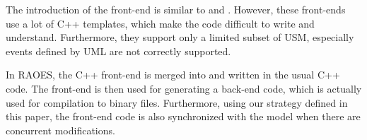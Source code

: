 The introduction of the front-end is similar to  \cite{MSM} and  \cite{EUML}.
However, these front-ends use a lot of C++ templates, which make the code difficult to write and understand.
Furthermore, they support only a limited subset of USM, especially events defined by UML are not correctly supported.

In RAOES, the C++ front-end is merged into and written in the usual C++ code.
The front-end is then used for generating a back-end code, which is actually used for compilation to binary files.
Furthermore, using our strategy defined in this paper, the front-end code is also synchronized with the model when there are concurrent modifications.






